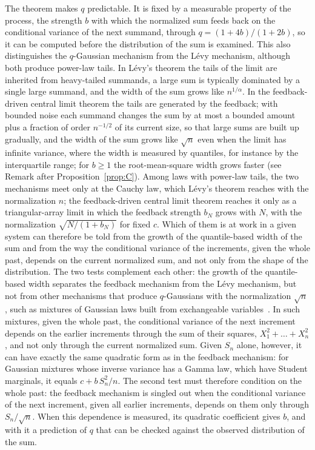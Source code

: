 \documentclass[aip,jmp,preprint,onecolumn,floatfix,superscriptaddress,nofootinbib,11pt]{revtex4-2}
\theoremstyle{plain}
\theoremstyle{remark}
\numberwithin{equation}{section}
\begin{document}
The theorem makes $q$ predictable. It is fixed by a measurable property of the process, the strength $b$ with which the normalized sum feeds back on the conditional variance of the next summand, through $q=(1+4b)/(1+2b)$, so it can be computed before the distribution of the sum is examined. This also distinguishes the $q$-Gaussian mechanism from the L\'evy mechanism, although both produce power-law tails. In L\'evy's theorem the tails of the limit are inherited from heavy-tailed summands, a large sum is typically dominated by a single large summand, and the width of the sum grows like $n^{1/\alpha}$. In the feedback-driven central limit theorem the tails are generated by the feedback; with bounded noise each summand changes the sum by at most a bounded amount plus a fraction of order $n^{-1/2}$ of its current size, so that large sums are built up gradually, and the width of the sum grows like $\sqrt n$ even when the limit has infinite variance, where the width is measured by quantiles, for instance by the interquartile range; for $b\ge1$ the root-mean-square width grows faster (see Remark after Proposition~\ref{prop:C}). Among laws with power-law tails, the two mechanisms meet only at the Cauchy law, which L\'evy's theorem reaches with the normalization $n$; the feedback-driven central limit theorem reaches it only as a triangular-array limit in which the feedback strength $b_N$ grows with $N$, with the normalization $\sqrt{N/(1+b_N)}$ for fixed $c$. Which of them is at work in a given system can therefore be told from the growth of the quantile-based width of the sum and from the way the conditional variance of the increments, given the whole past, depends on the current normalized sum, and not only from the shape of the distribution. The two tests complement each other: the growth of the quantile-based width separates the feedback mechanism from the L\'evy mechanism, but not from other mechanisms that produce $q$-Gaussians with the normalization $\sqrt n$, such as mixtures of Gaussian laws built from exchangeable variables~\cite{HJU2010}. In such mixtures, given the whole past, the conditional variance of the next increment depends on the earlier increments through the sum of their squares, $X_1^{2}+\dots+X_n^{2}$, and not only through the current normalized sum. Given $S_n$ alone, however, it can have exactly the same quadratic form as in the feedback mechanism: for Gaussian mixtures whose inverse variance has a Gamma law, which have Student marginals, it equals $c+b\,S_n^{2}/n$. The second test must therefore condition on the whole past: the feedback mechanism is singled out when the conditional variance of the next increment, given all earlier increments, depends on them only through $S_n/\sqrt n$. When this dependence is measured, its quadratic coefficient gives $b$, and with it a prediction of $q$ that can be checked against the observed distribution of the sum.
 
\end{document}
